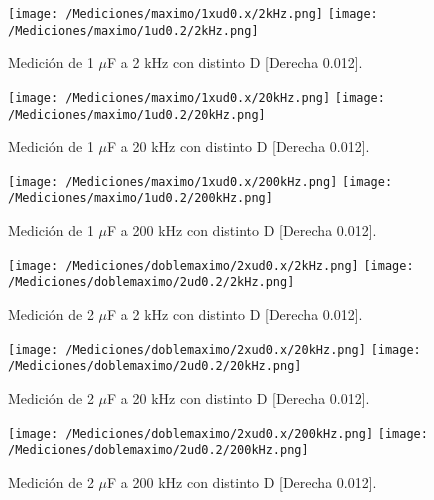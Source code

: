 \begin{figure}[H]
	\centering
	\texttt{[image: /Mediciones/maximo/1xud0.x/2kHz.png]}
	\texttt{[image: /Mediciones/maximo/1ud0.2/2kHz.png]}
\caption{Medición de 1 $\mu$F a 2 kHz con distinto D [Derecha 0.012].}
	\label{fig:fcon}
\end{figure}
\begin{figure}[H]
	\centering
	\texttt{[image: /Mediciones/maximo/1xud0.x/20kHz.png]}
	\texttt{[image: /Mediciones/maximo/1ud0.2/20kHz.png]}
\caption{Medición de 1 $\mu$F a 20 kHz con distinto D [Derecha 0.012].}
	\label{fig:fcon}
\end{figure}
\begin{figure}[H]
	\centering
	\texttt{[image: /Mediciones/maximo/1xud0.x/200kHz.png]}
	\texttt{[image: /Mediciones/maximo/1ud0.2/200kHz.png]}
\caption{Medición de 1 $\mu$F a 200 kHz con distinto D [Derecha 0.012].}
	\label{fig:fcon}
\end{figure}
\begin{figure}[H]
	\centering
	\texttt{[image: /Mediciones/doblemaximo/2xud0.x/2kHz.png]}
	\texttt{[image: /Mediciones/doblemaximo/2ud0.2/2kHz.png]}
\caption{Medición de 2 $\mu$F a 2 kHz con distinto D [Derecha 0.012].}
	\label{fig:fcon}
\end{figure}
\begin{figure}[H]
	\centering
	\texttt{[image: /Mediciones/doblemaximo/2xud0.x/20kHz.png]}
	\texttt{[image: /Mediciones/doblemaximo/2ud0.2/20kHz.png]}
\caption{Medición de 2 $\mu$F a 20 kHz con distinto D [Derecha 0.012].}
	\label{fig:fcon}
\end{figure}
\begin{figure}[H]
	\centering
	\texttt{[image: /Mediciones/doblemaximo/2xud0.x/200kHz.png]}
	\texttt{[image: /Mediciones/doblemaximo/2ud0.2/200kHz.png]}
\caption{Medición de 2 $\mu$F a 200 kHz con distinto D [Derecha 0.012].}
	\label{fig:fcon}
\end{figure}


